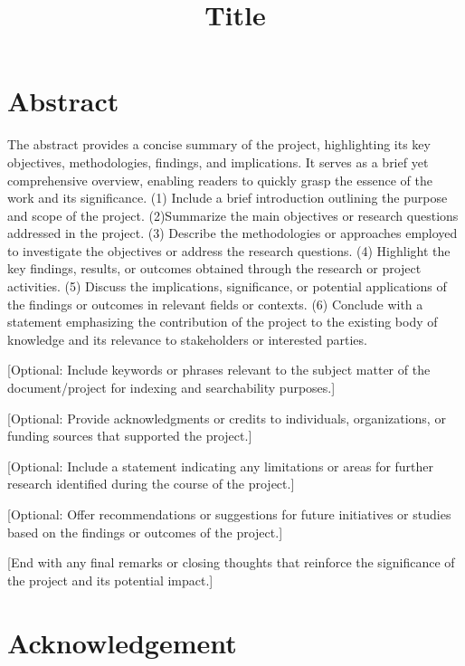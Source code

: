 \documentclass[a4paper, twoside]{report}
\title{Title}
\begin{document}


\section*{Abstract} \large 
The abstract provides a concise summary of the project, highlighting its key objectives, methodologies, findings, and implications. It serves as a brief yet comprehensive overview, enabling readers to quickly grasp the essence of the work and its significance. (1) Include a brief introduction outlining the purpose and scope of the project. (2)Summarize the main objectives or research questions addressed in the project. (3) Describe the methodologies or approaches employed to investigate the objectives or address the research questions. (4) Highlight the key findings, results, or outcomes obtained through the research or project activities. (5) Discuss the implications, significance, or potential applications of the findings or outcomes in relevant fields or contexts. (6) Conclude with a statement emphasizing the contribution of the project to the existing body of knowledge and its relevance to stakeholders or interested parties.

[Optional: Include keywords or phrases relevant to the subject matter of the document/project for indexing and searchability purposes.]

[Optional: Provide acknowledgments or credits to individuals, organizations, or funding sources that supported the project.]

[Optional: Include a statement indicating any limitations or areas for further research identified during the course of the project.]

[Optional: Offer recommendations or suggestions for future initiatives or studies based on the findings or outcomes of the project.]

[End with any final remarks or closing thoughts that reinforce the significance of the project and its potential impact.] 

\clearpage



\section*{Acknowledgement} \large
\end{document}
